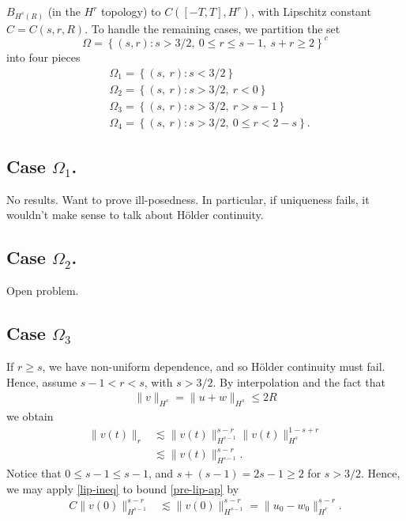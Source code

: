\documentclass[12pt,reqno]{amsart}
\numberwithin{equation}{section}  %
\begin{document}
$B_{H^{s}(R)}$ (in the $H^{r}$
topology) to $C([-T, T], H^{r})$, with Lipschitz constant $C = C(s, r, R)$.
%
%
To handle the remaining cases, we partition the set
$$\Omega = \left\{ (s,r): s > 3/2, \ 0 \le r \le s-1, \ s + r \ge 2
\right\}^{c}$$ into four pieces
%
%
\begin{equation*}
\begin{split}
  & \Omega_{1} = \left\{ (s, \ r): s<3/2 \right\}\\
  & \Omega_{2} = \left\{ (s, \ r): s>3/2, \  r <0  \right\}
  \\
  & \Omega_{3} = \left\{ (s, \ r): s>3/2, \  r > s-1  \right\}
  \\
  & \Omega_{4} = \left\{ (s, \ r): s>3/2, \  0 \le r < 2-s  \right\}.
\end{split}
\end{equation*}
%
%

%
%
%
%
\subsection{Case $\Omega_{1}$.} 
\label{ssec:case-1}
No results. Want to prove ill-posedness. In particular, if uniqueness fails,
it wouldn't make sense to talk about H\"older continuity.
%
%
\subsection{Case $\Omega_{2}$.} 
\label{ssec:case-bb}
Open problem.
%
%
%
\subsection{Case $\Omega_{3}$} 
\label{ssec:case-2}
If $r \ge s$, we have non-uniform dependence, and so H\"older continuity must
fail. Hence, assume $s-1 < r <s$, with $s > 3/2$.
By interpolation and the fact that 
%
%
\begin{equation*}
\begin{split}
  \|v\|_{H^{s}} = \|u + w \|_{H^{s}} \le 2R
\end{split}
\end{equation*}
%
%
we obtain
%
%
\begin{equation}
  \label{pre-lip-ap}
\begin{split}
  \| v(t) \|_{r} & \lesssim \| v(t) \|_{H^{s-1}}^{s-r} \|v(t) \|_{H^{s}}^{1-s+r}
  \\
  & \lesssim \| v(t) \|_{H^{s-1}}^{s-r}.
\end{split}
\end{equation}
%
%
Notice that $0 \le s-1 \le s-1$, and $s + (s-1) = 2s-1 \ge 2$ for $s >3/2$.
Hence, we may apply \eqref{lip-ineq} to bound \eqref{pre-lip-ap} by
%
%
\begin{equation*}
\begin{split}
  C \|v(0) \|_{H^{s-1}}^{s-r}
  & \lesssim \|v(0) \|_{H^{s-1}}^{s-r} 
  = \|u_{0} - w_{0}\|_{H^{r}}^{s-r}.
\end{split}
\end{equation*}
%
\end{document}
